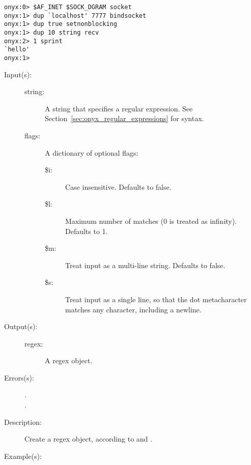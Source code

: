 \begin{description}
\begin{description}
\begin{verbatim}
onyx:0> $AF_INET $SOCK_DGRAM socket
onyx:1> dup `localhost' 7777 bindsocket
onyx:1> dup true setnonblocking
onyx:1> dup 10 string recv
onyx:2> 1 sprint
`hello'
onyx:1>
		\end{verbatim}
	\end{description}
\label{systemdict:regex}
\item[{\onyxop{string flags}{regex}{regex}}: ]
\item[{\onyxop{string}{regex}{regex}}: ]
	\begin{description}\item[]
	\item[Input(s): ]
		\begin{description}\item[]
		\item[string: ]
			A string that specifies a regular expression.  See
			Section~\ref{sec:onyx_regular_expressions} for syntax.
		\item[flags: ]
			A dictionary of optional flags:
			\begin{description}%
			\item[\$i: ] Case insensitive.  Defaults to false.
			\item[\$l: ] Maximum number of matches (0 is treated as
				infinity).  Defaults to 1.
			\item[\$m: ] Treat input as a multi-line string.
				Defaults to false.
			\item[\$s: ] Treat input as a single line, so that
				the dot metacharacter matches any character,
				including a newline.
			\end{description}
		\end{description}
	\item[Output(s): ]
		\begin{description}\item[]
		\item[regex: ]
			A regex object.
		\end{description}
	\item[Errors(s): ]
		\begin{description}\item[]
		\item[.]
		\item[.]
		\end{description}
	\item[Description: ]
		Create a regex object, according to  and
		.
	\item[Example(s): ]\begin{verbatim}


\end{verbatim}
\end{description}
\end{description}
